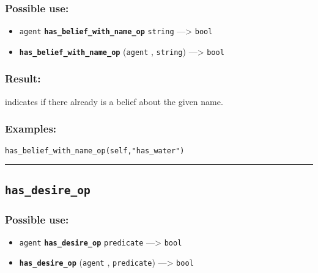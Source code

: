 \documentclass[]{book}
\providecommand{\tightlist}{%
  \setlength{\itemsep}{0pt}\setlength{\parskip}{0pt}}
\theoremstyle{definition}
\theoremstyle{definition}
\theoremstyle{definition}
\theoremstyle{remark}
\begin{document}
\subsubsection{Possible use:}\label{possible-use-247}

\begin{itemize}
\tightlist
\item
  \texttt{agent} \textbf{\texttt{has\_belief\_with\_name\_op}}
  \texttt{string} ---\textgreater{} \texttt{bool}
\item
  \textbf{\texttt{has\_belief\_with\_name\_op}} (\texttt{agent} ,
  \texttt{string}) ---\textgreater{} \texttt{bool}
\end{itemize}

\subsubsection{Result:}\label{result-238}

indicates if there already is a belief about the given name.

\subsubsection{Examples:}\label{examples-187}

\begin{verbatim}
has_belief_with_name_op(self,"has_water") 
\end{verbatim}

\begin{center}\rule{0.5\linewidth}{\linethickness}\end{center}

\subsection{\texorpdfstring{\texttt{has\_desire\_op}}{has\_desire\_op}}\label{has_desire_op}

\subsubsection{Possible use:}\label{possible-use-248}

\begin{itemize}
\tightlist
\item
  \texttt{agent} \textbf{\texttt{has\_desire\_op}} \texttt{predicate}
  ---\textgreater{} \texttt{bool}
\item
  \textbf{\texttt{has\_desire\_op}} (\texttt{agent} ,
  \texttt{predicate}) ---\textgreater{} \texttt{bool}
\end{itemize}
\end{document}
